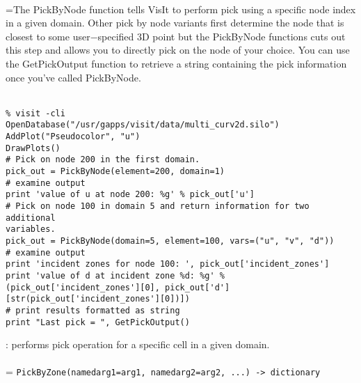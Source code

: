 \documentclass[10pt,a4paper]{report}
\begin{document}
 \\ 
\hangindent=\parindent The PickByNode function tells VisIt to perform pick using a specific node index in a given domain. Other pick by node variants first determine the node that is closest to some user$-$specified 3D point but the PickByNode functions cuts out this step and allows you to directly pick on the node of your choice. You can use the GetPickOutput function to retrieve a string containing the pick information once you've called PickByNode. \\[-3mm] 

\\[-6mm]
\begin{verbatim}% visit -cli
OpenDatabase("/usr/gapps/visit/data/multi_curv2d.silo")
AddPlot("Pseudocolor", "u")
DrawPlots()
# Pick on node 200 in the first domain.
pick_out = PickByNode(element=200, domain=1)
# examine output
print 'value of u at node 200: %g' % pick_out['u']
# Pick on node 100 in domain 5 and return information for two additional
variables.
pick_out = PickByNode(domain=5, element=100, vars=("u", "v", "d"))
# examine output
print 'incident zones for node 100: ', pick_out['incident_zones']
print 'value of d at incident zone %d: %g' % (pick_out['incident_zones'][0], pick_out['d'][str(pick_out['incident_zones'][0])])
# print results formatted as string
print "Last pick = ", GetPickOutput()
\end{verbatim}
\newpage


{}
: performs pick operation for a specific cell in a given domain.\\[-3mm]

 \\ 
\hangindent=\parindent 
\verb!PickByZone(namedarg1=arg1, namedarg2=arg2, ...) -> dictionary!\\ [-3mm]
\end{document}
